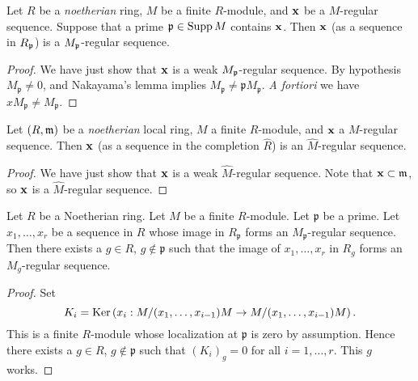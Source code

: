 	\begin{corollary}
		Let $R$ be a \emph{noetherian} ring, $M$ be a finite $R$-module, and $\mathbf{x}$ be a $M$-regular sequence. Suppose that a prime $\mathfrak{p} \in \operatorname{Supp} M$ contains $\mathbf{x}$. Then $\mathbf{x}$ (as a sequence in $R_{\mathfrak{p}}$) is a $M_{\mathfrak{p}}$-regular sequence.
		
		\cite[Corollary 1.1.3(1)]{BH}
	\end{corollary}
	
	\begin{proof}
		We have just show that $\mathbf{x}$ is a weak $M_{\mathfrak{p}}$-regular sequence. By hypothesis $M_{\mathfrak{p}} \neq 0$, and Nakayama's lemma implies $M_{\mathfrak{p}} \neq \mathfrak{p}M_{\mathfrak{p}}$. \textit{A fortiori} we have $xM_{\mathfrak{p}} \neq M_{\mathfrak{p}}$.
	\end{proof}
	
	\begin{corollary}
		Let $(R, \mathfrak{m})$ be a \emph{noetherian} local ring, $M$ a finite $R$-module, and $\mathbf{x}$ a $M$-regular sequence.  Then $\mathbf{x}$ (as a sequence in the completion $\hat R$) is an $\hat M$-regular sequence.
		
		\cite[Corollary 1.1.3(2)]{BH}
	\end{corollary}
	
	\begin{proof}
		We have just show that $\mathbf{x}$ is a weak $\hat M$-regular sequence. Note that $\mathbf{x} \subset \mathfrak{m}$, so $\mathbf{x}$ is a $\hat M$-regular sequence.
	\end{proof}
	
	\begin{lemma}
		\label{lemma-regular-sequence-in-neighbourhood}
		Let $R$ be a Noetherian ring. Let $M$ be a finite $R$-module.
		Let $\mathfrak p$ be a prime. Let $x_1, \ldots, x_r$ be a sequence
		in $R$ whose image in $R_{\mathfrak p}$ forms an $M_{\mathfrak p}$-regular
		sequence. Then there exists a $g \in R$, $g \not \in \mathfrak p$
		such that the image of $x_1, \ldots, x_r$ in $R_g$ forms
		an $M_g$-regular sequence.
		
		\cite[\href{https://stacks.math.columbia.edu/tag/061L}{Lemma 061L}]{stacks-project}
	\end{lemma}
	\begin{proof}
		Set
		$$
		K_i = \operatorname{Ker}\left(x_i : M/(x_1, \ldots, x_{i - 1})M \to
		M/(x_1, \ldots, x_{i - 1})M\right).
		$$
		This is a finite $R$-module whose localization at $\mathfrak p$ is
		zero by assumption. Hence there exists a $g \in R$, $g \not \in \mathfrak p$
		such that $(K_i)_g = 0$ for all $i = 1, \ldots, r$. This $g$ works.
	\end{proof}
	
